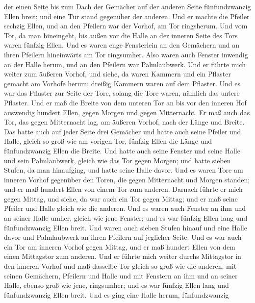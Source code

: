 der einen Seite bis zum Dach der Gemächer auf der anderen Seite
fünfundzwanzig Ellen breit; und eine Tür stand gegenüber der anderen.
 Und er machte die Pfeiler sechzig Ellen, und an den
Pfeilern war der Vorhof, am Tor ringsherum.  Und vom Tor,
da man hineingeht, bis außen vor die Halle an der inneren Seite des Tors
waren fünfzig Ellen.  Und es waren enge Fensterlein an
den Gemächern und an ihren Pfeilern hineinwärts am Tor ringsumher. Also
waren auch Fenster inwendig an der Halle herum, und an den Pfeilern war
Palmlaubwerk.  Und er führte mich weiter zum äußeren
Vorhof, und siehe, da waren Kammern und ein Pflaster gemacht am Vorhofe
herum; dreißig Kammern waren auf dem Pflaster.  Und es
war das Pflaster zur Seite der Tore, solang die Tore waren, nämlich das
untere Pflaster.  Und er maß die Breite von dem unteren
Tor an bis vor den inneren Hof auswendig hundert Ellen, gegen Morgen und
gegen Mitternacht.  Er maß auch das Tor, das gegen
Mitternacht lag, am äußeren Vorhof, nach der Länge und Breite.
 Das hatte auch auf jeder Seite drei Gemächer und hatte
auch seine Pfeiler und Halle, gleich so groß wie am vorigen Tor, fünfzig
Ellen die Länge und fünfundzwanzig Ellen die Breite.  Und
hatte auch seine Fenster und seine Halle und sein Palmlaubwerk, gleich
wie das Tor gegen Morgen; und hatte sieben Stufen, da man hinaufging,
und hatte seine Halle davor.  Und es waren Tore am
inneren Vorhof gegenüber den Toren, die gegen Mitternacht und Morgen
standen; und er maß hundert Ellen von einem Tor zum anderen.
 Darnach führte er mich gegen Mittag, und siehe, da war
auch ein Tor gegen Mittag; und er maß seine Pfeiler und Halle gleich wie
die anderen.  Und es waren auch Fenster an ihm und an
seiner Halle umher, gleich wie jene Fenster; und es war fünfzig Ellen
lang und fünfundzwanzig Ellen breit.  Und waren auch
sieben Stufen hinauf und eine Halle davor und Palmlaubwerk an ihren
Pfeilern auf jeglicher Seite.  Und es war auch ein Tor am
inneren Vorhof gegen Mittag, und er maß hundert Ellen von dem einen
Mittagstor zum anderen.  Und er führte mich weiter durchs
Mittagstor in den inneren Vorhof und maß dasselbe Tor gleich so groß wie
die anderen,  mit seinen Gemächern, Pfeilern und Halle
und mit Fenstern an ihm und an seiner Halle, ebenso groß wie jene,
ringsumher; und es war fünfzig Ellen lang und fünfundzwanzig Ellen
breit.  Und es ging eine Halle herum, fünfundzwanzig
